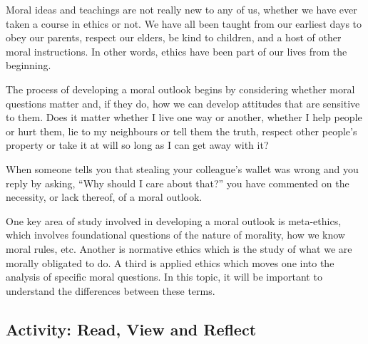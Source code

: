 \documentclass[
]{book}
\begin{document}
Moral ideas and teachings are not really new to any of us, whether we have ever taken a course in ethics or not. We have all been taught from our earliest days to obey our parents, respect our elders, be kind to children, and a host of other moral instructions. In other words, ethics have been part of our lives from the beginning.

The process of developing a moral outlook begins by considering whether moral questions matter and, if they do, how we can develop attitudes that are sensitive to them. Does it matter whether I live one way or another, whether I help people or hurt them, lie to my neighbours or tell them the truth, respect other people's property or take it at will so long as I can get away with it?

When someone tells you that stealing your colleague's wallet was wrong and you reply by asking, ``Why should I care about that?'' you have commented on the necessity, or lack thereof, of a moral outlook.

One key area of study involved in developing a moral outlook is meta-ethics, which involves foundational questions of the nature of morality, how we know moral rules, etc. Another is normative ethics which is the study of what we are morally obligated to do. A third is applied ethics which moves one into the analysis of specific moral questions. In this topic, it will be important to understand the differences between these terms.

\hypertarget{activity-read-view-and-reflect}{%
\subsection*{Activity: Read, View and Reflect}\label{activity-read-view-and-reflect}}
\end{document}
